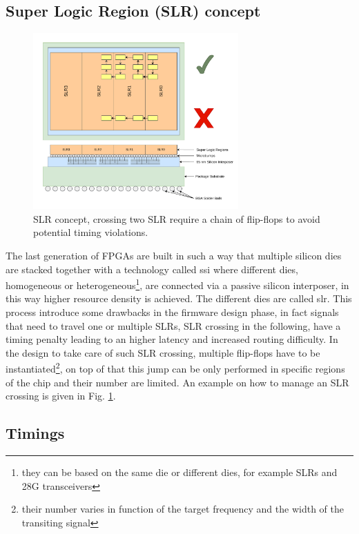 \documentclass[../../main.tex]{subfiles}
\begin{document}
\subsection{Super Logic Region (SLR) concept}
\label{sec:FPGA_SLR}
\begin{figure}[h]
    \centering
    \includegraphics[width=0.7\textwidth]{sections/04/Images/FPGA_SLRCROSS.pdf}
    \caption{SLR concept, crossing two SLR require a chain of flip-flops to avoid potential timing violations.}
    \label{fig:SLR-CROSS}
\end{figure}
        
The last generation of FPGAs are built in such a way that multiple silicon dies are stacked together with a technology called \acrfull{ssi} where different dies, homogeneous or heterogeneous\footnote{they can be based on the same die or different dies, for example SLRs and 28G transceivers}, are connected via a passive silicon interposer, in this way higher resource density is achieved. The different dies are called \acrfull{slr}. This process introduce some drawbacks in the firmware design phase, in fact signals that need to travel one or multiple SLRs, SLR crossing in the following, have a timing penalty leading to an higher latency and increased routing difficulty.  
In the design to take care of such SLR crossing, multiple flip-flops have to be instantiated\footnote{their number varies in function of the target frequency and the width of the transiting signal}, on top of that this jump can be only performed in specific regions of the chip and their number are limited. An example on how to manage an SLR crossing is given in Fig. \ref{fig:SLR-CROSS}.
        
        
        
\subsection{Timings}
\label{sec:FPGA_timings}
\end{document}
